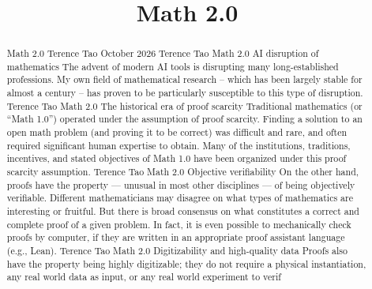 \title{Math 2.0}

\maketitle

\begin{abstract}
Math 2.0 Terence Tao October 2026 Terence Tao Math 2.0 AI disruption of mathematics The advent of modern AI tools is disrupting many long-established professions. My own field of mathematical research – which has been largely stable for almost a century – has proven to be particularly susceptible to this type of disruption. Terence Tao Math 2.0 The historical era of proof scarcity Traditional mathematics (or “Math 1.0”) operated under the assumption of proof scarcity. Finding a solution to an open math problem (and proving it to be correct) was difficult and rare, and often required significant human expertise to obtain. Many of the institutions, traditions, incentives, and stated objectives of Math 1.0 have been organized under this proof scarcity assumption. Terence Tao Math 2.0 Objective verifiability On the other hand, proofs have the property — unusual in most other disciplines — of being objectively verifiable. Different mathematicians may disagree on what types of mathematics are interesting or fruitful. But there is broad consensus on what constitutes a correct and complete proof of a given problem. In fact, it is even possible to mechanically check proofs by computer, if they are written in an appropriate proof assistant language (e.g., Lean). Terence Tao Math 2.0 Digitizability and high-quality data Proofs also have the property being highly digitizable; they do not require a physical instantiation, any real world data as input, or any real world experiment to verif
\end{abstract}

